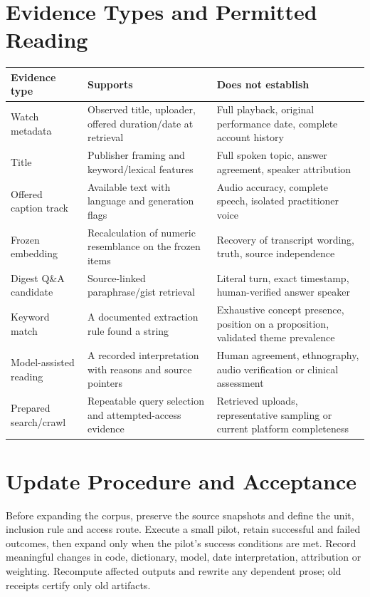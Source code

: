 \section{Evidence Types and Permitted Reading}
\begin{longtable}{p{}p{}p{}}
\toprule Evidence type & Supports & Does not establish \\ \midrule\endhead
Watch metadata & Observed title, uploader, offered duration/date at retrieval & Full playback, original performance date, complete account history \\
Title & Publisher framing and keyword/lexical features & Full spoken topic, answer agreement, speaker attribution \\
Offered caption track & Available text with language and generation flags & Audio accuracy, complete speech, isolated practitioner voice \\
Frozen embedding & Recalculation of numeric resemblance on the frozen items & Recovery of transcript wording, truth, source independence \\
Digest Q\&A candidate & Source-linked paraphrase/gist retrieval & Literal turn, exact timestamp, human-verified answer speaker \\
Keyword match & A documented extraction rule found a string & Exhaustive concept presence, position on a proposition, validated theme prevalence \\
Model-assisted reading & A recorded interpretation with reasons and source pointers & Human agreement, ethnography, audio verification or clinical assessment \\
Prepared search/crawl & Repeatable query selection and attempted-access evidence & Retrieved uploads, representative sampling or current platform completeness \\
\bottomrule
\end{longtable}

\section{Update Procedure and Acceptance}
Before expanding the corpus, preserve the source snapshots and define the unit, inclusion rule and access route. Execute a small pilot, retain successful and failed outcomes, then expand only when the pilot's success conditions are met. Record meaningful changes in code, dictionary, model, date interpretation, attribution or weighting. Recompute affected outputs and rewrite any dependent prose; old receipts certify only old artifacts.


